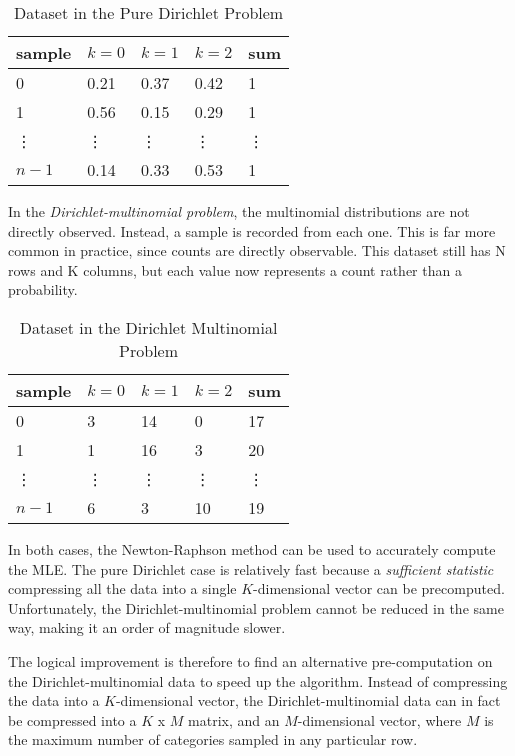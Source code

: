 \documentclass[twoside]{article}
\begin{document}
\begin{table}[h] \centering
\begin{tabular}{ l | l l l | l}
  sample & \(k=0\) & \(k=1\) & \(k=2\) & sum \\ \hline
  0 & 0.21 & 0.37 & 0.42 & 1\\
  1 & 0.56 & 0.15 & 0.29 & 1\\
  \vdots & \vdots & \vdots & \vdots & \vdots\\
  \(n-1\) & 0.14 & 0.33 & 0.53 & 1\\
\end{tabular}
\caption{Dataset in the Pure Dirichlet Problem}\label{tab:d}
\end{table}

In the \textit{Dirichlet-multinomial problem}, the multinomial distributions are not directly observed. Instead, a sample is recorded from each one.  This is far more common in practice, since counts are directly observable.  This dataset still has N rows and K columns, but each value now represents a count rather than a probability.

\begin{table}[h] \centering
\begin{tabular}{ l | l l l | l}
  sample & \(k=0\) & \(k=1\) & \(k=2\) & sum \\ \hline
  0 & 3 & 14 & 0 & 17\\
  1 & 1 & 16 & 3 & 20\\
  \vdots & \vdots & \vdots & \vdots & \vdots\\
  \(n-1\) & 6 & 3 & 10 & 19\\
\end{tabular}
\caption{Dataset in the Dirichlet Multinomial Problem}\label{tab:dm}
\end{table}

In both cases, the Newton-Raphson method can be used to accurately compute the MLE\cite{minka}.  The pure Dirichlet case is relatively fast because a \textit{sufficient statistic} compressing all the data into a single \(K\)-dimensional vector can be precomputed.  Unfortunately, the Dirichlet-multinomial problem cannot be reduced in the same way, making it an order of magnitude slower.

The logical improvement is therefore to find an alternative pre-computation on the Dirichlet-multinomial data to speed up the algorithm.  Instead of compressing the data into a \(K\)-dimensional vector, the Dirichlet-multinomial data can in fact be compressed into a \(K\) x \(M\) matrix, and an \(M\)-dimensional vector, where \(M\) is the maximum number of categories sampled in any particular row.
\end{document}
